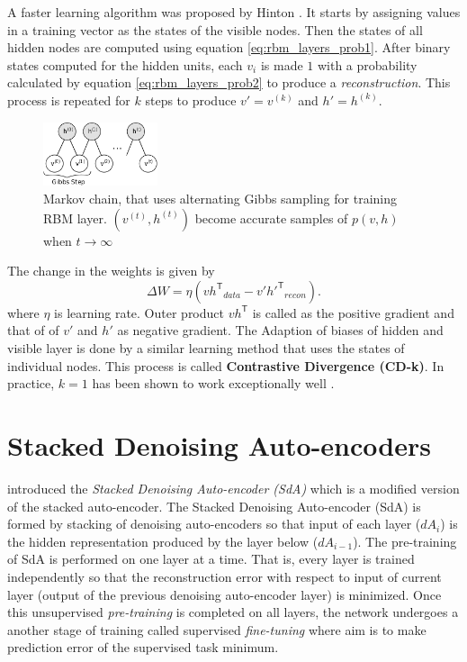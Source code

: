 A faster learning algorithm was proposed by Hinton \cite{hinton2002training,hinton2006reducing,hinton2010practical}. It starts by assigning values in a training vector as the states of the visible nodes. Then the states of all hidden nodes are computed using equation \ref{eq:rbm_layers_prob1}. After binary states computed for the hidden units, each $v_i$ is made $1$ with a probability calculated by equation \ref{eq:rbm_layers_prob2} to produce a \textit{reconstruction}. This process is repeated for $k$ steps to produce $v'= v^{(k)}$ and $h' = h^{(k)}$. 

\begin{figure}[ht]
\centering
\includegraphics[width=0.3\textwidth]{./imgs/markov_chain.png}
\caption[Markov chain of training RBM layer]{Markov chain, that uses alternating Gibbs sampling for training RBM layer. $(v^{(t)}, h^{(t)})$ become accurate samples of $p(v,h)$ when $t \rightarrow \infty$}
\label{fig:rbmmarkovChain}
\end{figure}

The change in the weights is given by
$$ \Delta W = \eta ({vh^\mathsf{T}}_{data} - {v'h'^{\mathsf{T}}}_{recon}). $$
where $\eta$ is learning rate. Outer product $vh^\mathsf{T}$ is called as the positive gradient and that of of $v'$ and $h'$ as negative gradient. The Adaption of biases of hidden and visible layer is done by a similar learning method that uses the states of individual nodes. This process is called \textbf{Contrastive Divergence (CD-k)}. In practice, $k=1$ has been shown to work exceptionally well \cite{hinton2010practical}.

\section{Stacked Denoising Auto-encoders}
\citet{vincent2010stacked} introduced the \emph{Stacked Denoising Auto-encoder (SdA)} which is a modified version of the stacked auto-encoder. The Stacked Denoising Auto-encoder (SdA) is formed by stacking of denoising auto-encoders so that input of each layer ($dA_i$) is the hidden representation produced by the layer below ($dA_{i-1}$). The pre-training of SdA is performed on one layer at a time. That is, every layer is trained independently so that the reconstruction error with respect to input of current layer (output of the previous denoising auto-encoder layer) is minimized. Once this unsupervised \textit{pre-training} is completed on all layers, the network undergoes a another stage of training called supervised \textit{fine-tuning} where aim is to make prediction error of the supervised task minimum.

